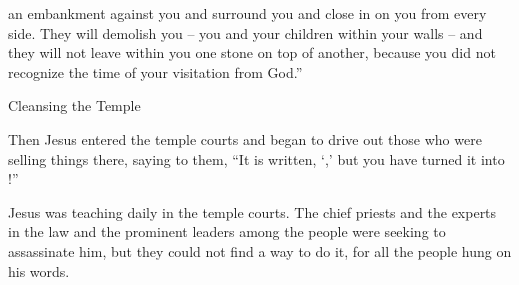 {an embankment
against you
and
surround
you
and
close in
on you
from every side.
They will demolish
you –
you and
your
children within your walls – and they will not leave within you one stone on top of another, because you did not recognize the time of your visitation from God.”
\par }{\SH Cleansing the Temple
\par }{\PP {}Then
Jesus entered
the temple courts
and began
to drive out
those who were selling things there,
saying
to them,
“It is written, ‘{},’ but
you
have turned
it
into
{}!”
\par }{\PP {}Jesus was
teaching
daily
in
the temple courts.
The
chief priests
and
the experts in the law
and
the prominent leaders
among the people
were seeking
to assassinate
him,
but
they could
not
find
a way
to do
it, for
all
the people
hung on
his
words.

}
